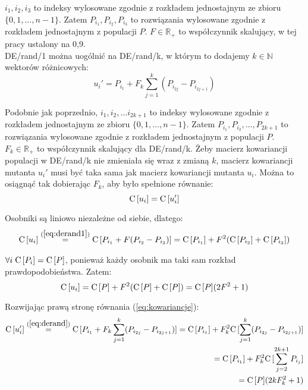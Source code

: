 $i_1, i_2, i_3$ to indeksy wylosowane zgodnie z rozkładem jednostajnym ze zbioru \\ 
$\{0, 1, \dots, n-1\}$. Zatem $P_{i_1}, P_{i_2}, P_{i_3}$ to rozwiązania wylosowane zgodnie z rozkładem jednostajnym z populacji $P$.
$F\in\mathbb{R_+}$ to współczynnik skalujący, w tej pracy ustalony na 0,9. \\

DE/rand/1 można uogólnić na DE/rand/k, w którym to dodajemy
$k \in \mathbb{N}$ wektorów różnicowych:
\begin{equation} \label{eq:derand}
u_i' = P_{i_1} + F_k\sum\limits_{j=1}^k (P_{i_{2j}} - P_{i_{2j+1}})
\end{equation}

Podobnie jak poprzednio, $i_1, i_2, \dots i_{2k+1}$ to indeksy wylosowane zgodnie z rozkładem jednostajnym ze zbioru 
$\{0, 1, \dots, n-1\}$. Zatem $P_{i_1}, P_{i_2}, \dots, P_{2k+1}$ to rozwiązania wylosowane zgodnie z rozkładem 
jednostajnym z populacji $P$. $F_k\in\mathbb{R_+}$ to współczynnik skalujący dla DE/rand/k. 
Żeby macierz kowariancji populacji w DE/rand/k nie zmieniała się wraz z zmianą $k$, 
macierz kowariancji mutanta $u_i'$ musi być taka sama jak macierz kowariancji mutanta $u_i$.
Można to osiągnąć tak dobierając $F_k$, aby było spełnione równanie:
\begin{equation} \label{eq:kowariancje}
{\rm C}\,[u_i] = {\rm C}\,[u_i']
\end{equation}

Osobniki są liniowo niezależne od siebie, dlatego:
\begin{align*}
{\rm C}\,[u_i] \overset{(\ref{eq:derand1})}{=} {\rm C}\,[P_{i_1} + F(P_{i_2} - P_{i_3})] = {\rm C}\,[P_{i_1}] + F^2({\rm C}\,[P_{i_2}] + {\rm C}\,[P_{i_3}])
\end{align*}

$\forall{i}\hspace{1mm}{\rm C}\,[P_i] = {\rm C}\,[P]$, ponieważ każdy osobnik ma taki sam rozkład prawdopodobieństwa. Zatem:
\begin{equation} \label{eq:macierz_kow_mutanta}
{\rm C}\,[u_i] = {\rm C}\,[P] + F^2({\rm C}\,[P] + {\rm C}\,[P]) = {\rm C}\,[P](2F^2 + 1)
\end{equation}

Rozwijając prawą stronę równania (\ref{eq:kowariancje}):
\begin{align*}
{\rm C}\,[u_i'] \overset{(\ref{eq:derand})}{=} {\rm C}\,[P_{i_1} + F_k\sum\limits_{j=1}^k (P_{i_{2j}} - P_{i_{2j+1}})] 
= {\rm C}\,[P_{i_1}] + F_k^2{\rm C}\,[\sum\limits_{j=1}^k (P_{i_{2j}} - P_{i_{2j+1}})] \\
= {\rm C}\,[P_{i_1}] + F_k^2{\rm C}\,[\sum\limits_{j=2}^{2k+1} P_{i_{j}}] \\
= {\rm C}\,[P](2kF_k^2 + 1)
\end{align*}

